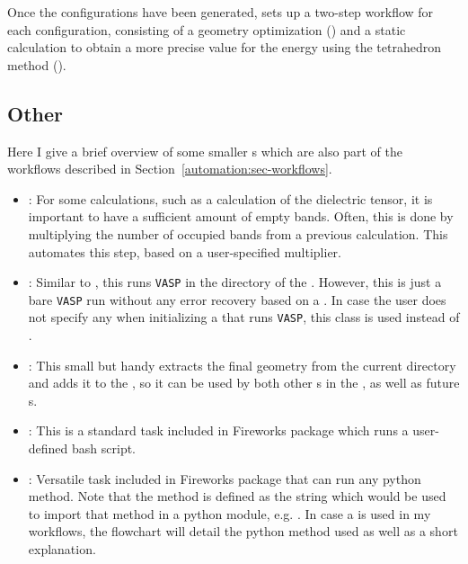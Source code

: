 \begin{refsection}
Once the configurations have been generated,  sets up a two-step workflow for each configuration, consisting of a geometry optimization () and a static calculation to obtain a more precise value for the energy using the tetrahedron method ().

\subsection{Other}

Here I give a brief overview of some smaller s which are also part of the workflows described in Section~\ref{automation:sec-workflows}. 

\begin{itemize}

 \label{automation:sec-IncreaseNumberOfBands}
\item {}: For some calculations, such as a calculation of the dielectric tensor, it is important to have a sufficient amount of empty bands. Often, this is done by multiplying the number of occupied bands from a previous calculation. This  automates this step, based on a user-specified multiplier.

 \label{automation:sec-VaspTask}
\item {}: Similar to , this  runs \texttt{VASP} in the directory of the . However, this is just a bare \texttt{VASP} run without any error recovery based on a . In case the user does not specify any  when initializing a  that runs \texttt{VASP}, this class is used instead of .

 \label{automation:sec-AddFinalGeometryToSpec}
\item {}: This small but handy  extracts the final geometry from the current directory and adds it to the , so it can be used by both other s in the , as well as future s.

 \label{automation:sec-ScriptTask}
\item {}: This is a standard task included in Fireworks package which runs a user-defined bash script.

 \label{automation:sec-PyTask}
\item {}: Versatile task included in Fireworks package that can run any python method. Note that the method is defined as the string which would be used to import that method in a python module, e.g. . In case a  is used in my workflows, the flowchart will detail the python method used as well as a short explanation.


\end{itemize}
\end{refsection}
